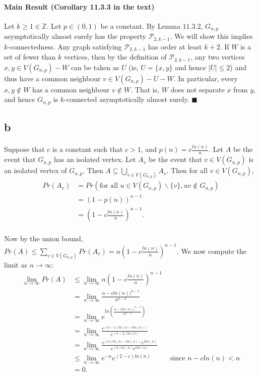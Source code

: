 \documentclass[letterpaper,12pt,oneside,onecolumn]{report}
\begin{document}
\paragraph{Main Result (Corollary 11.3.3 in the text)}
Let $k \geq 1 \in \mathbb{Z}$. Let $p \in (0,1)$ be a constant. By Lemma $11.3.2$, $G_{n,p}$ asymptotically almost surely has the property $\mathcal{P}_{2,k-1}$. We will show this implies $k$-connectedness. Any graph satisfying $\mathcal{P}_{2,k-1}$ has order at least $k+2$.  If $W$ is a set of fewer than $k$ vertices, then by the definition of $\mathcal{P}_{2,k-1}$, any two vertices $x,y \in V(G_{n,p}) - W$ can be taken as $U$ (ie, $U = \{x,y\}$ and hence $|U| \leq 2$) and thus have a common neighbour $v \in V(G_{n,p}) - U - W$. In particular, every $x,y \not\in W$ has a common neighbour $v \not\in W$. That is, $W$ does not separate $x$ from $y$, and hence $G_{n,p}$ is $k$-connected asymptotically almost surely. $\blacksquare$
\subsection*{b}
\paragraph{}
Suppose that $c$ is a constant such that $c > 1$, and $p(n) = c\frac{ln(n)}{n}$. Let $A$ be the event that $G_{n,p}$ has an isolated vertex. Let $A_v$ be the event that $v \in V(G_{n,p})$ is an isolated vertex of $G_{n,p}$. Then $A \subseteq \bigcup_{v \in V(G_{n,p})} A_v$. Then for all $v \in V(G_{n,p})$,
\begin{align*}
Pr(A_v) &= Pr(\text{for all } u \in V(G_{n,p})\backslash \{v\}, uv \not\in G_{n,p}) \\
&= (1- p(n))^{n-1} \\
&= (1- c\frac{ln(n)}{n})^{n-1}.
\end{align*}
\paragraph{}
Now by the union bound, $Pr(A) \leq \sum_{v\in V(G_{n,p})} Pr(A_v) = n(1- c\frac{ln(n)}{n})^{n-1}$. We now compute the limit as $n \rightarrow \infty$:
\begin{align*}
\lim_{n \to \infty} Pr(A) &\leq \lim_{n\to \infty} n(1- c\frac{ln(n)}{n})^{n-1} \\
&= \lim_{n\to \infty} \frac{n-cln(n))^{n-1}}{n^{n-2}} \\
&=  \lim_{n\to \infty} e^{ln(\frac{n-cln(n))^{n-1}}{n^{n-2}})} \\
&=  \lim_{n\to \infty} \frac{e^{(n-1)ln(n - cln(n))}}{e^{(n-2)ln(n)}}\\
&=  \lim_{n\to \infty} \frac{e^{(n)ln(n - cln(n))}e^{2ln(n)}}{e^{(n)ln(n)}e^{cln(n)}}\\
&\leq \lim_{n\to \infty} e^{-n}e^{(2-c)ln(n)} &\text{ since $n-cln(n) < n$} \\
& = 0.
\end{align*}
\end{document}
